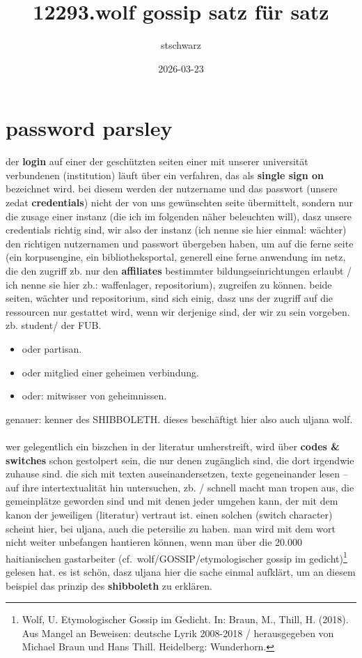 \documentclass[
  letterpaper,
  DIV=11,
  numbers=noendperiod]{scrartcl}
\title{12293.wolf gossip satz für satz}
\author{stschwarz}
\date{2026-03-23}
\makeatletter
\let\oldparagraph\paragraph
\renewcommand{\paragraph}{
    \@ifstar
      \xxxParagraphStar
      \xxxParagraphNoStar
  }
\newcommand{\xxxParagraphStar}[1]{\oldparagraph*{#1}\mbox{}}
\newcommand{\xxxParagraphNoStar}[1]{\oldparagraph{#1}\mbox{}}
\providecommand{\tightlist}{%
  \setlength{\itemsep}{0pt}\setlength{\parskip}{0pt}}
\makeatother
\begin{document}
\maketitle


\section{password parsley}\label{password-parsley}

der \textbf{login} auf einer der geschützten seiten einer mit unserer
universität verbundenen (institution) läuft über ein verfahren, das als
\textbf{single sign on} bezeichnet wird. bei diesem werden der
nutzername und das passwort (unsere zedat \textbf{credentials}) nicht
der von uns gewünschten seite übermittelt, sondern nur die zusage einer
instanz (die ich im folgenden näher beleuchten will), dasz unsere
credentials richtig sind, wir also der instanz (ich nenne sie hier
einmal: wächter) den richtigen nutzernamen und passwort übergeben haben,
um auf die ferne seite (ein korpusengine, ein bibliotheksportal,
generell eine ferne anwendung im netz, die den zugriff zb. nur den
\textbf{affiliates} bestimmter bildungseinrichtungen erlaubt / ich nenne
sie hier zb.: waffenlager, repositorium), zugreifen zu können. beide
seiten, wächter und repositorium, sind sich einig, dasz uns der zugriff
auf die ressourcen nur gestattet wird, wenn wir derjenige sind, der wir
zu sein vorgeben. zb. student/ der FUB.

\begin{itemize}
\tightlist
\item
  oder partisan.
\item
  oder mitglied einer geheimen verbindung.
\item
  oder: mitwisser von geheimnissen.
\end{itemize}

genauer: kenner des SHIBBOLETH. dieses beschäftigt hier also auch uljana
wolf.

\paragraph{}\label{section}

wer gelegentlich ein biszchen in der literatur umherstreift, wird über
\textbf{codes \& switches} schon gestolpert sein, die nur denen
zugänglich sind, die dort irgendwie zuhause sind. die sich mit texten
auseinandersetzen, texte gegeneinander lesen -- auf ihre
intertextualität hin untersuchen, zb. / schnell macht man tropen aus,
die gemeinplätze geworden sind und mit denen jeder umgehen kann, der mit
dem kanon der jeweiligen (literatur) vertraut ist. einen solchen (switch
character) scheint hier, bei uljana, auch die petersilie zu haben. man
wird mit dem wort nicht weiter unbefangen hantieren können, wenn man
über die 20.000 haitianischen gastarbeiter
(cf.~wolf/GOSSIP/etymologischer gossip im gedicht)\footnote{Wolf, U.
  Etymologischer Gossip im Gedicht. In: Braun, M., Thill, H. (2018). Aus
  Mangel an Beweisen: deutsche Lyrik 2008-2018 / herausgegeben von
  Michael Braun und Hans Thill. Heidelberg: Wunderhorn.} gelesen hat. es
ist schön, dasz uljana hier die sache einmal aufklärt, um an diesem
beispiel das prinzip des \textbf{shibboleth} zu erklären.
\end{document}
